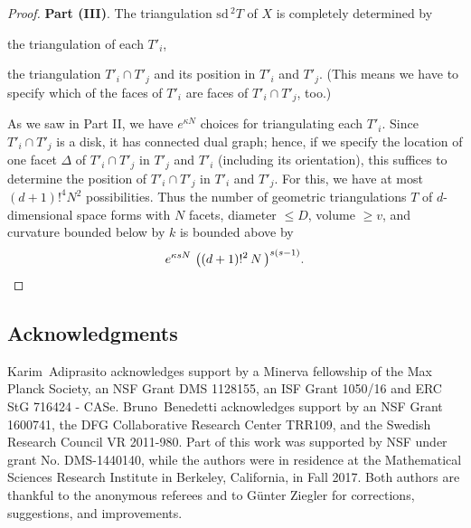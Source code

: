 \documentclass[a4paper,11pt]{article}
\theoremstyle{plain}
\theoremstyle{definition}
\newcommand{\sd}{\mathrm{sd}\, }
\begin{document}
\begin{proof}
\smallskip

\noindent \textbf{Part (III)}. 
The triangulation $\sd^2 T$ of $X$ is completely determined by
\begin{compactenum}[(i)]
\item the triangulation of each $T'_i$,
\item the triangulation $T'_i\cap T'_j$ and its position in $T'_i$ and $T'_j$. (This means we have to specify which of the faces of $T'_i$ are faces of $T'_i\cap T'_j$, too.) 
\end{compactenum}
As we saw in Part II, we have $e^{\kappa N}$ choices for triangulating each $T'_i$. Since $T'_i\cap T'_j$ is a disk, it has connected dual graph; hence, if we specify the location of one facet $\Delta$ of $T'_i\cap T'_j$ in $T'_j$ and $T'_i$ (including its orientation), this suffices to determine the position of $T'_i\cap T'_j$ in $T'_i$ and $T'_j$. For this, we have at most ${(d+1)!}^{4} N^2$ possibilities. Thus the number of geometric triangulations $T$ of $d$-dimensional space forms with $N$ facets, diameter $\le D$, volume $\ge v$, and curvature bounded below by $k$ is bounded above by
\[
{e}^{\kappa sN} \, 
{\, \left((d+1)!^2 \, N \, \right)}^{s(s-1)}. \qedhere
\]
\end{proof}
\vskip-2mm
\enlargethispage{2mm}
{\small

\subsection*{Acknowledgments}
Karim~Adiprasito acknowledges support by a Minerva fellowship of the Max Planck Society, an NSF Grant DMS 1128155, an ISF Grant 1050/16 and ERC StG 716424 - CASe.
Bruno~Benedetti acknowledges support by an NSF Grant 1600741, the DFG Collaborative Research Center TRR109, and the Swedish Research Council VR 2011-980. 
Part of this work was supported by NSF under grant No. DMS-1440140, while the authors were in residence at the Mathematical Sciences Research Institute in Berkeley, California, in Fall 2017. Both authors are thankful to the anonymous referees and to G\"unter Ziegler for corrections, suggestions, and improvements.
}
\end{document}
